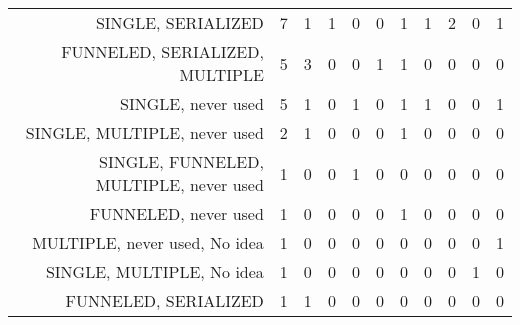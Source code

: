 {\begin{landscape}
\begin{longtable}[htb]{r|c|c|c|c|c|c|c|c|c|c}
{SINGLE, SERIALIZED} & 7 & 1 & 1 & 0 & 0 & 1 & 1 & 2 & 0 & 1 \\%
{FUNNELED, SERIALIZED, MULTIPLE} & 5 & 3 & 0 & 0 & 1 & 1 & 0 & 0 & 0 & 0 \\%
{SINGLE, never used} & 5 & 1 & 0 & 1 & 0 & 1 & 1 & 0 & 0 & 1 \\%
{SINGLE, MULTIPLE, never used} & 2 & 1 & 0 & 0 & 0 & 1 & 0 & 0 & 0 & 0 \\%
{SINGLE, FUNNELED, MULTIPLE, never used} & 1 & 0 & 0 & 1 & 0 & 0 & 0 & 0 & 0 & 0 \\%
{FUNNELED, never used} & 1 & 0 & 0 & 0 & 0 & 1 & 0 & 0 & 0 & 0 \\%
{MULTIPLE, never used, No idea} & 1 & 0 & 0 & 0 & 0 & 0 & 0 & 0 & 0 & 1 \\%
{SINGLE, MULTIPLE, No idea} & 1 & 0 & 0 & 0 & 0 & 0 & 0 & 0 & 1 & 0 \\%
{FUNNELED, SERIALIZED} & 1 & 1 & 0 & 0 & 0 & 0 & 0 & 0 & 0 & 0 \\%
\hline%
\end{longtable}%
\end{landscape}}%
\clearpage%
